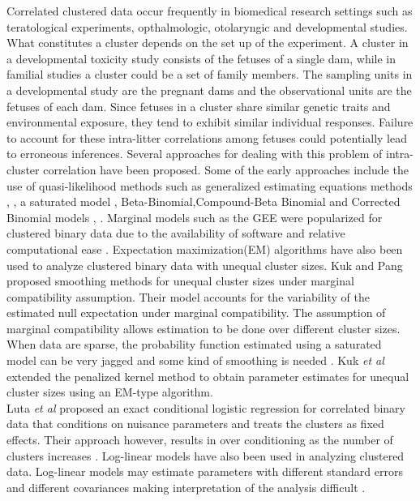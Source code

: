 \documentclass[12pt,oneside]{report}
\theoremstyle{definition}
\theoremstyle{mystyle}
\begin{document}
Correlated clustered data occur frequently in  biomedical research settings such as  teratological experiments, opthalmologic, otolaryngic  and developmental studies. 
 What constitutes a cluster  depends on the set up of the experiment. A cluster in a developmental toxicity study consists of the fetuses of a single dam, while in familial studies a cluster could be a set of family members. The sampling units in a developmental study are the pregnant dams and the observational units are the fetuses of each dam. Since fetuses in a cluster share similar genetic traits and environmental exposure, they tend to exhibit similar individual responses. Failure to account for these intra-litter correlations among fetuses could potentially lead to erroneous inferences.
Several approaches for dealing with this problem of intra-cluster correlation have been proposed. Some of the early approaches include the use of quasi-likelihood methods such as generalized estimating equations methods    \cite{prentice}, \cite{gee}, a saturated model \cite{bg}, Beta-Binomial,Compound-Beta Binomial and Corrected Binomial models \cite{williams}, \cite{Rosner}. Marginal models such as the GEE were popularized for clustered binary data due to the availability of software and relative computational ease \cite{molenberghs}. Expectation maximization(EM) algorithms have also been used to analyze clustered binary data with unequal cluster sizes\cite{Stefanescu}. Kuk and Pang \cite{kuk} proposed smoothing methods for unequal cluster sizes under marginal compatibility assumption. Their model accounts for the variability of the  estimated null expectation under marginal compatibility. The assumption of marginal compatibility allows estimation to be done over different cluster sizes. When data are sparse, the probability function estimated using a saturated model can be very jagged and some kind of smoothing is needed \cite{kuk}. Kuk \emph{et al} extended the penalized kernel method to obtain parameter estimates for  unequal cluster sizes using an EM-type algorithm.\\
Luta \textit{et al} \cite{Luta} proposed an exact conditional logistic regression  for correlated binary data that  conditions on nuisance parameters and treats the clusters as fixed effects. Their approach however, results in  over conditioning as the number of clusters increases \cite{cocoran}. Log-linear models have also been used in analyzing clustered data. Log-linear models may estimate parameters with different standard errors and different covariances making interpretation of the analysis difficult  \cite{djbest}.
\end{document}

